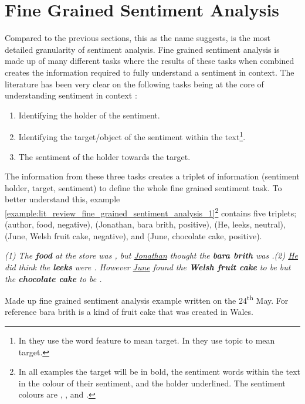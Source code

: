 \section{Fine Grained Sentiment Analysis}
\label{section:lit_review_fine_grained_sentiment_analysis_intro}

Compared to the previous sections, this as the name suggests, is the most detailed granularity of sentiment analysis. Fine grained sentiment analysis is made up of many different tasks where the results of these tasks when combined creates the information required to fully understand a sentiment in context. The literature has been very clear on the following tasks being at the core of understanding sentiment in context \citep{wiebe-1994-tracking, kim-hovy-2004-determining, ding2008holistic, liu2015sentiment}:
\begin{enumerate}
    \item Identifying the holder of the sentiment.
    \item Identifying the target/object of the sentiment within the text\footnote{In \citet{ding2008holistic} they use the word feature to mean target. In \citet{kim-hovy-2004-determining} they use topic to mean target.}.
    \item The sentiment of the holder towards the target.
\end{enumerate}

The information from these three tasks creates a triplet of information (sentiment holder, target, sentiment) to define the whole fine grained sentiment task. To better understand this, example \ref{example:lit_review_fine_grained_sentiment_analysis_1}\footnote{In all examples the target will be in bold, the sentiment words within the text in the colour of their sentiment, and the holder underlined. The sentiment colours are , , and .} contains five triplets; (author, food, negative), (Jonathan, bara brith, positive), (He, leeks, neutral), (June, Welsh fruit cake, negative), and (June, chocolate cake, positive). 


\begin{example}
\textit{(1) The \textbf{food} at the store was , but \underline{Jonathan} thought the \textbf{bara brith} was .(2) \underline{He} did think the \textbf{leeks} were . However \underline{June} found the \textbf{Welsh fruit cake} to be  but the \textbf{chocolate cake} to be .}
\caption{Made up fine grained sentiment analysis example written on the 24\textsuperscript{th} May. For reference bara brith is a kind of fruit cake that was created in Wales.}
\label{example:lit_review_fine_grained_sentiment_analysis_1}
\end{example}

